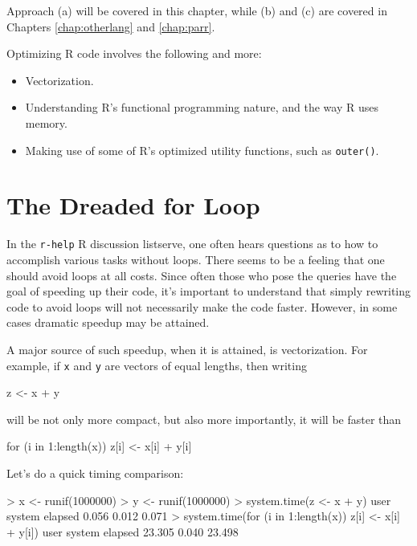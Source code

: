 \noindent
Approach (a) will be covered in this chapter, while (b) and (c) are
covered in Chapters \ref{chap:otherlang} and \ref{chap:parr}.

Optimizing R code involves the following and more:

\begin{itemize}

\item Vectorization. 

\item Understanding R's functional programming nature, and the way R
uses memory.

\item Making use of some of R's optimized utility functions, such as
{\tt outer()}. 

\end{itemize}

\section{The Dreaded for Loop}

In the {\tt r-help} R discussion listserve, one often hears questions as
to how to accomplish various tasks without loops.  There seems to be a
feeling that one should avoid loops at all costs.  Since often those who
pose the queries have the goal of speeding up their code, it's important
to understand that simply rewriting code to avoid loops will not
necessarily make the code faster.  However, in some cases dramatic
speedup may be attained.

A major source of such speedup, when it is attained, is vectorization.
For example, if {\tt x} and {\tt y} are vectors of equal lengths, then
writing

\begin{Code}
z <- x + y
\end{Code}

\noindent
will be not only more compact, but also more importantly, it will be
faster than

\begin{Code}
for (i in 1:length(x)) z[i] <- x[i] + y[i]
\end{Code}

Let's do a quick timing comparison:

\begin{Code}
> x <- runif(1000000)
> y <- runif(1000000)
> system.time(z <- x + y)
   user  system elapsed 
  0.056   0.012   0.071 
> system.time(for (i in 1:length(x)) z[i] <- x[i] + y[i])
   user  system elapsed 
 23.305   0.040  23.498 
\end{Code}

